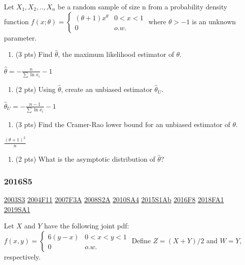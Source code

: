 \documentclass[10pt,twocolumn,portrait]{article}
\providecommand{\tightlist}{%
  \setlength{\itemsep}{0pt}\setlength{\parskip}{0pt}}
\begin{document}
Let \(X_1,X_2,..,X_n\) be a random sample of size n from a probability
density function
\(f(x;\theta)=\begin{cases}(\theta+1)x^\theta& 0<x<1\\0& o.w.\end{cases}\)
where \(\theta>-1\) is an unknown parameter.

\begin{enumerate}
\def\labelenumi{(\alph{enumi})}
\tightlist
\item
  (3 pts) Find \(\hat\theta\), the maximum likelihood estimator of
  \(\theta\).
\end{enumerate}

\(\hat\theta=-\frac{n}{\sum\ln x_i}-1\)

\begin{enumerate}
\def\labelenumi{(\alph{enumi})}
\setcounter{enumi}{1}
\tightlist
\item
  (2 pts) Using \(\hat\theta\), create an unbiased estimator
  \(\hat\theta_U\).
\end{enumerate}

\(\hat\theta_U=-\frac{n-1}{\sum\ln x_i}-1\)

\begin{enumerate}
\def\labelenumi{(\alph{enumi})}
\setcounter{enumi}{2}
\tightlist
\item
  (3 pts) Find the Cramer-Rao lower bound for an unbiased estimator of
  \(\theta\).
\end{enumerate}

\(\frac{(\theta+1)^2}{n}\)

\begin{enumerate}
\def\labelenumi{(\alph{enumi})}
\setcounter{enumi}{3}
\tightlist
\item
  (2 pts) What is the asymptotic distribution of \(\hat\theta\)?
\end{enumerate}

\hypertarget{s5-4}{%
\subsubsection{2016S5}\label{s5-4}}

\protect\hyperlink{s3}{2003S3} \protect\hyperlink{f11}{2004F11}
\protect\hyperlink{f3a}{2007F3A} \protect\hyperlink{s2a}{2008S2A}
\protect\hyperlink{sa4-1}{2010SA4} \protect\hyperlink{s1ab}{2015S1Ab}
\protect\hyperlink{f8-4}{2016F8} \protect\hyperlink{fa1-4}{2018FA1}
\protect\hyperlink{sa1-3}{2019SA1}

Let \(X\) and \(Y\) have the following joint pdf:
\(f(x,y) =\begin{cases}6(y-x)& 0<x<y<1\\0& o.w.\end{cases}\) Define
\(Z=(X+Y)/2\) and \(W=Y\), respectively.
\end{document}
